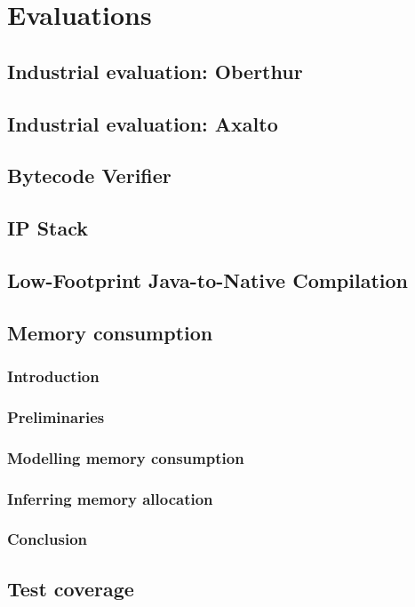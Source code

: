 \chapter{Evaluations}
\section{Industrial evaluation: Oberthur}
\section{Industrial evaluation: Axalto}
\section{Bytecode Verifier}
\section{IP Stack}
\section{Low-Footprint Java-to-Native Compilation}

\section{Memory consumption}
\subsection{Introduction}

\subsection{Preliminaries}\label{sec:prelim}

\subsection{Modelling memory consumption}\label{sec:verif}

\subsection{Inferring memory allocation}\label{sec:infer}

\subsection{Conclusion}\label{sec:conc}

\section{Test coverage}
